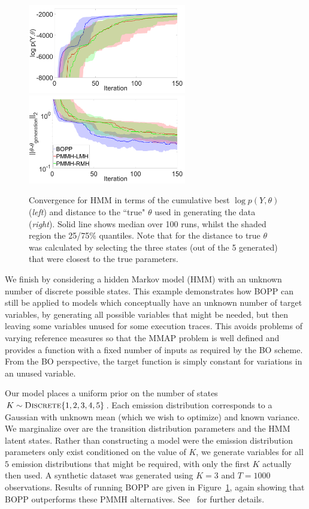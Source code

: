 
\begin{figure}[t]
	\centering
	\includegraphics[width=2.72in]{hmm/hmm_ML}
	\includegraphics[width=2.72in]{hmm/hmm_distance}
	\caption{Convergence for HMM in terms of the cumulative best $\log p\left(Y,\theta\right)$ (\emph{left}) and distance to the ``true" $\theta$ used in generating the data (\emph{right}). Solid line shows median over 100 runs, whilst the shaded region the 25/75\% quantiles.  Note that for the distance to true $\theta$ was calculated by selecting the three states (out of the 5 generated) that were closest to the true parameters.  \label{fig:hmm}}
\end{figure}

We finish by considering a hidden Markov model (HMM) with an unknown number of discrete possible states.  
This example demonstrates how BOPP can still be applied to models which conceptually have an 
unknown number of target variables, by generating all possible variables that might be needed, 
but then leaving some variables unused for some execution traces.  This avoids problems 
of varying reference measures so that the MMAP problem is well defined  and provides a 
function with a fixed number of inputs as required by the BO scheme.  From the BO 
perspective, the target function is simply constant for variations in an unused variable.

Our model places a uniform prior on the number of states $K \sim \textsc{Discrete}\{1,2,3,4,5\}$.
Each emission distribution corresponds to a Gaussian with unknown mean (which we wish to
optimize) and known variance.  
We marginalize over are the transition distribution parameters and the HMM latent states.  
Rather than constructing a model were the emission distribution
parameters only exist conditioned on the value of $K$, we generate variables for all $5$ emission
distributions that might be required, with only the first $K$ actually then used.  
A synthetic dataset was generated using $K=3$ and $T=1000$ observations.  Results of running BOPP are given
in Figure~\ref{fig:hmm}, again showing that BOPP outperforms these PMMH alternatives.  See~\cite{rainforth2017boppArxiv}
for further details.